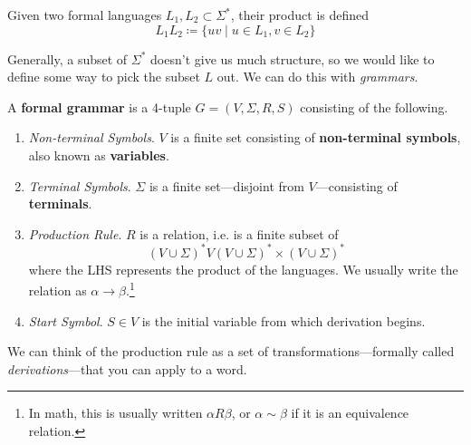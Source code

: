   \begin{definition}
    Given two formal languages $L_1, L_2 \subset \Sigma^\ast$, their product is defined 
    \begin{equation}
      L_1 L_2 \coloneqq \{ uv \mid u \in L_1, v \in L_2 \}
    \end{equation}
  \end{definition}

  Generally, a subset of $\Sigma^\ast$ doesn't give us much structure, so we would like to define some way to pick the subset $L$ out. We can do this with \textit{grammars}. 

  \begin{definition}
    A \textbf{formal grammar} is a 4-tuple $G = (V, \Sigma, R, S)$ consisting of the following. 
    \begin{enumerate}
      \item \textit{Non-terminal Symbols}. $V$ is a finite set consisting of \textbf{non-terminal symbols}, also known as \textbf{variables}. 
      \item \textit{Terminal Symbols}. $\Sigma$ is a finite set---disjoint from $V$---consisting of \textbf{terminals}. 
      \item \textit{Production Rule}. $R$ is a relation, i.e. is a finite subset of 
        \begin{equation}
          (V \cup \Sigma)^\ast V (V \cup \Sigma)^\ast \times (V \cup \Sigma)^\ast
        \end{equation}
        where the LHS represents the product of the languages. We usually write the relation as $\alpha \to \beta$.\footnote{In math, this is usually written $\alpha R \beta$, or $\alpha \sim \beta$ if it is an equivalence relation.}

      \item \textit{Start Symbol}. $S \in V$ is the initial variable from which derivation begins. 
    \end{enumerate}
  \end{definition}

  We can think of the production rule as a set of transformations---formally called \textit{derivations}---that you can apply to a word. 

